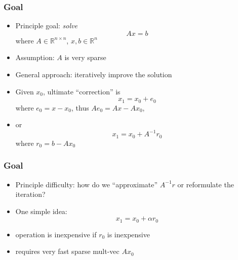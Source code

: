 \documentclass[10pt]{beamer}
\newcommand{\R}{{\mathbb{R}}}
\begin{document}
\begin{frame}
\frametitle{Goal}
  \begin{itemize}
    \item Principle goal: \emph{solve}
      \begin{equation*}
        A x= b
      \end{equation*}
      where $A \in \R^{n\times n}$, $x,b\in \R^{n}$
    \item Assumption: $A$ is very sparse
    \item General approach: iteratively improve the solution
    \item Given $x_0$, ultimate ``correction'' is
    \begin{equation*}
      x_1 = x_0 + e_0
    \end{equation*}
      where $e_0 = x-x_0$, thus $Ae_0=Ax-Ax_0$, 
    \item  or
    \begin{equation*}
      x_1 = x_0 + A^{-1} r_0
    \end{equation*}
      where $r_0 = b-Ax_0$
  \end{itemize}
\end{frame}
\begin{frame}
\frametitle{Goal}
  \begin{itemize}
    \item Principle difficulty: how do we ``approximate'' $A^{-1}r$ or
reformulate the iteration?
    \item One simple idea:
    \begin{equation*}
      x_1 = x_0 + \alpha r_0
    \end{equation*}
    \item operation is inexpensive if $r_0$ is inexpensive
    \item requires very fast sparse mult-vec $Ax_0$
  \end{itemize}
\end{frame}
\end{document}
